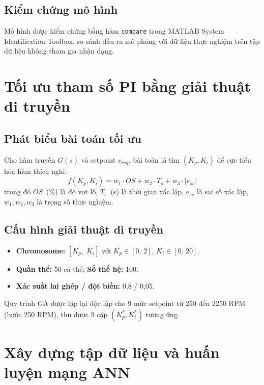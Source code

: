 \subsection{Kiểm chứng mô hình}

Mô hình được kiểm chứng bằng hàm \texttt{compare} trong MATLAB System
Identification Toolbox, so sánh đầu ra mô phỏng với dữ liệu thực nghiệm
trên tập dữ liệu không tham gia nhận dạng.


\section{Tối ưu tham số PI bằng giải thuật di truyền}

\subsection{Phát biểu bài toán tối ưu}

Cho hàm truyền $G(s)$ và setpoint $v_{req}$, bài toán là tìm $(K_p, K_i)$ để
cực tiểu hóa hàm thích nghi:
\begin{equation}
    f(K_p, K_i) = w_1 \cdot OS + w_2 \cdot T_s + w_3 \cdot |e_{ss}|
    \label{eq:fitness}
\end{equation}
trong đó $OS$~(\%) là độ vọt lố, $T_s$~(s) là thời gian xác lập, $e_{ss}$
là sai số xác lập, $w_1,w_2,w_3$ là trọng số thực nghiệm.

\subsection{Cấu hình giải thuật di truyền}

\begin{itemize}
    \item \textbf{Chromosome:} $[K_p,\; K_i]$ với $K_p \in [0,\,2]$,
    $K_i \in [0,\,20]$.
    \item \textbf{Quần thể:} 50 cá thể; \textbf{Số thế hệ:} 100.
    \item \textbf{Xác suất lai ghép / đột biến:} 0,8 / 0,05.
\end{itemize}

Quy trình GA được lặp lại độc lập cho 9 mức setpoint từ 250 đến 2250 RPM
(bước 250 RPM), thu được 9 cặp $(K_p^*, K_i^*)$ tương ứng.


\section{Xây dựng tập dữ liệu và huấn luyện mạng ANN}

